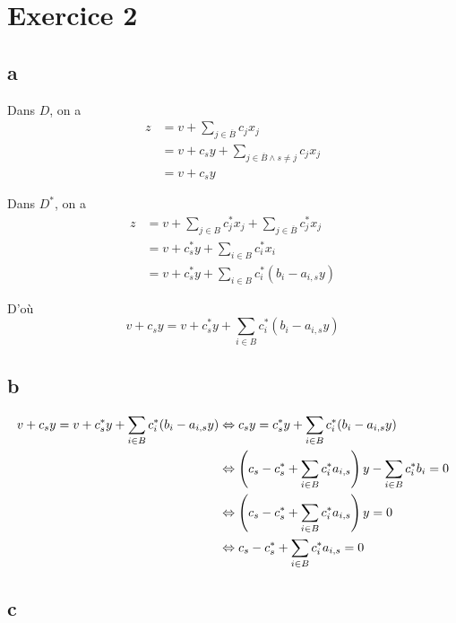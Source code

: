 \section*{Exercice 2}

\subsection*{a}

Dans $D$, on a 
\[
    \begin{aligned}
        z &= v + \sum\limits_{j\in\overline{B}} c_j x_j \\
        &= v + c_s y + \sum\limits_{j\in\overline{B} \wedge s\neq j} c_j x_j\\
        &= v + c_s y
    \end{aligned}
\]

Dans $D^*$, on a 
\[
    \begin{aligned}
        z &= v + \sum\limits_{j\in B} c_j^*x_j + \sum\limits_{j\in \overline{B}} c_j^*x_j \\
        &= v + c^*_s y + \sum\limits_{i\in B} c_i^* x_i \\
        &= v + c^*_s y + \sum\limits_{i\in B} c_i^* (b_i - a_{i,s}y)
    \end{aligned}
\]

D'où
\[
    v + c_s y = v + c^*_s y + \sum\limits_{i\in B} c_i^* (b_i - a_{i,s}y)
\]

\subsection*{b}

\[
    \begin{aligned}
        v + c_s y = v + c^*_s y + \sum\limits_{i\in B} c_i^* (b_i - a_{i,s}y) &\Leftrightarrow c_s y = c^*_s y + \sum\limits_{i\in B} c_i^* (b_i - a_{i,s}y)\\
        &\Leftrightarrow \left(c_s - c^*_s + \sum\limits_{i\in B} c_i^*  a_{i,s}\right) y - \sum\limits_{i\in B} c_i^* b_i = 0\\
        &\Leftrightarrow \left(c_s - c^*_s + \sum\limits_{i\in B} c_i^*  a_{i,s}\right) y =0\\
        &\Leftrightarrow c_s - c^*_s + \sum\limits_{i\in B} c_i^*  a_{i,s} =0
    \end{aligned}
\]

\subsection*{c}

